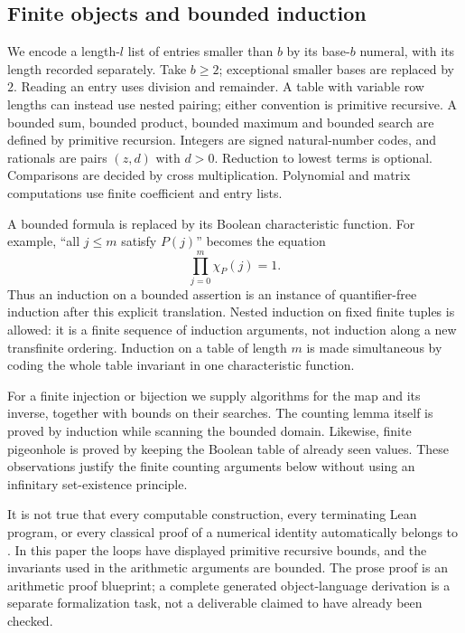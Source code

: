 \subsection{Finite objects and bounded induction}

We encode a length-$l$ list of entries smaller than $b$ by its base-$b$ numeral,
with its length recorded separately.  Take $b\ge2$; exceptional smaller bases
are replaced by $2$.  Reading an entry uses division and remainder.  A table
with variable row lengths can instead use nested pairing; either convention is
primitive recursive.  A bounded sum, bounded product, bounded maximum and
bounded search are defined by primitive recursion.  Integers are signed
natural-number codes, and rationals are pairs $(z,d)$ with $d>0$.  Reduction to
lowest terms is optional.  Comparisons are decided by cross multiplication.
Polynomial and matrix computations use finite coefficient and entry lists.

A bounded formula is replaced by its Boolean characteristic function.  For
example, ``all $j\le m$ satisfy $P(j)$'' becomes the equation
\[
 \prod_{j=0}^{m}\chi_P(j)=1.
\]
Thus an induction on a bounded assertion is an instance of quantifier-free
induction after this explicit translation.  Nested induction on fixed finite
tuples is allowed: it is a finite sequence of induction arguments, not induction
along a new transfinite ordering.  Induction on a table of length $m$ is made
simultaneous by coding the whole table invariant in one characteristic function.

For a finite injection or bijection we supply algorithms for the map and its
inverse, together with bounds on their searches.  The counting lemma itself is
proved by induction while scanning the bounded domain.  Likewise, finite
pigeonhole is proved by keeping the Boolean table of already seen values.
These observations justify the finite counting arguments below without using
an infinitary set-existence principle.

\begin{remark}
It is not true that every computable construction, every terminating Lean
program, or every classical proof of a numerical identity automatically belongs
to \ipra.  In this paper the loops have displayed primitive recursive bounds,
and the invariants used in the arithmetic arguments are bounded.  The prose
proof is an arithmetic proof blueprint; a complete generated object-language
derivation is a separate formalization task, not a deliverable claimed to have
already been checked.
\end{remark}

